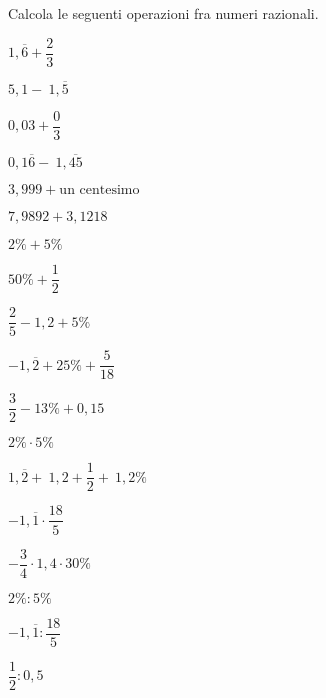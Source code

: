 \pagebreak   %
\begin{esercizio}
 \label{ese:3.45}
Calcola le seguenti operazioni fra numeri razionali.

\begin{htmulticols}{3}
\begin{enumeratees}
\spazielenx
\item \(1,\overline{6} +\dfrac{2}{3}\)
\item \(5,1 -~1,\overline{5}\)
\item \(0,03+ \dfrac{0}{3}\)
\item \(0,1\overline{6} -~1,\overline{45}\)
\item \(3,999+ \text{un centesimo}\)
\item \(7,9892+3,1218\)
\item \(2\% + 5\%\)
\item \(50\% + \dfrac{1}{2}\)
\item \(\dfrac{2}{5}-1,2+5\%~\)
\item \(-1,\overline{2}+25\%+\dfrac{5}{18}\)
\item \(\dfrac{3}{2} -13\% +0,15\)
\item \(2\% \cdot 5\%\)
\item \(1,\overline{2} +~1,2 + \dfrac{1}{2} +~1,2\%~\)
% 
% 
\item \(-1,\overline{1} \cdot \dfrac{18}{5}\)
\item \(-\dfrac{3}{4} \cdot 1,4 \cdot 30\%\)
\item \(2\% : 5\%\)
% 
% 
\item \(-1,\overline{1} : \dfrac{18}{5}\)
\item \(\dfrac{1}{2} : 0,5\)
\end{enumeratees}
\end{htmulticols}
\end{esercizio}

